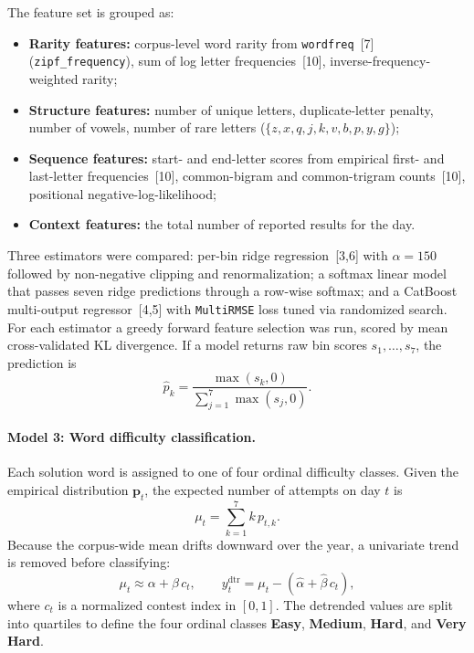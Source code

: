 \documentclass{article}
\begin{document}
The feature set is grouped as:
\begin{itemize}
  \item \textbf{Rarity features:} corpus-level word rarity from
        \texttt{wordfreq}~[7] (\texttt{zipf\_frequency}), sum of log letter
        frequencies~[10], inverse-frequency-weighted rarity;
  \item \textbf{Structure features:} number of unique letters, duplicate-letter
        penalty, number of vowels, number of rare letters
        ($\{z,x,q,j,k,v,b,p,y,g\}$);
  \item \textbf{Sequence features:} start- and end-letter scores from empirical
        first- and last-letter frequencies~[10], common-bigram and
        common-trigram counts~[10], positional negative-log-likelihood;
  \item \textbf{Context features:} the total number of reported results for the
        day.
\end{itemize}

Three estimators were compared: per-bin ridge regression~[3,6] with
$\alpha=150$ followed by non-negative clipping and renormalization; a softmax
linear model that passes seven ridge predictions through a row-wise softmax;
and a CatBoost multi-output regressor~[4,5] with \texttt{MultiRMSE} loss tuned
via randomized search. For each estimator a greedy forward feature selection
was run, scored by mean cross-validated KL divergence. If a model returns raw
bin scores $s_1,\dots,s_7$, the prediction is
\begin{equation}
  \hat p_k = \frac{\max(s_k, 0)}{\sum_{j=1}^{7} \max(s_j, 0)}.
\end{equation}

\paragraph{Model 3: Word difficulty classification.}
Each solution word is assigned to one of four ordinal difficulty classes.
Given the empirical distribution $\mathbf{p}_t$, the expected number of
attempts on day $t$ is
\begin{equation}
  \mu_t = \sum_{k=1}^{7} k\,p_{t,k}.
\end{equation}
Because the corpus-wide mean drifts downward over the year, a univariate trend
is removed before classifying:
\begin{equation}
  \mu_t \approx \alpha + \beta\, c_t,
  \qquad
  y^{\mathrm{dtr}}_t = \mu_t - (\hat\alpha + \hat\beta\, c_t),
\end{equation}
where $c_t$ is a normalized contest index in $[0,1]$. The detrended values are
split into quartiles to define the four ordinal classes \textbf{Easy},
\textbf{Medium}, \textbf{Hard}, and \textbf{Very Hard}.
\end{document}

